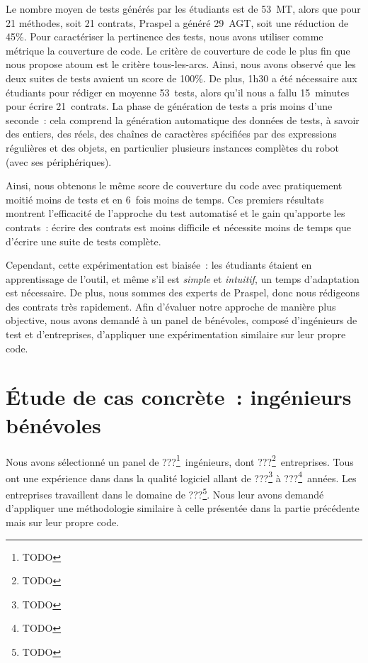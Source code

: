 Le nombre moyen de tests générés par les étudiants est de 53~MT, alors que pour
21 méthodes, soit 21 contrats, Praspel a généré 29~AGT, soit une réduction de
45\%. Pour caractériser la pertinence des tests, nous avons utiliser comme
métrique la couverture de code. Le critère de couverture de code le plus fin que
nous propose atoum est le critère tous-les-arcs. Ainsi, nous avons observé que
les deux suites de tests avaient un score de 100\%. De plus, 1h30 a été
nécessaire aux étudiants pour rédiger en moyenne 53~tests, alors qu'il nous a
fallu 15~minutes pour écrire 21~contrats.  La phase de génération de tests a
pris moins d'une seconde~: cela comprend la génération automatique des données
de tests, à savoir des entiers, des réels, des chaînes de caractères spécifiées
par des expressions régulières et des objets, en particulier plusieurs instances
complètes du robot (avec ses périphériques).

Ainsi, nous obtenons le même score de couverture du code avec pratiquement
moitié moins de tests et en 6~fois moins de temps. Ces premiers résultats
montrent l'efficacité de l'approche du test automatisé et le gain qu'apporte les
contrats~: écrire des contrats est moins difficile et nécessite moins de temps
que d'écrire une suite de tests complète.

Cependant, cette expérimentation est biaisée~: les étudiants étaient en
apprentissage de l'outil, et même s'il est {\em simple} et {\em intuitif}, un
temps d'adaptation est nécessaire. De plus, nous sommes des experts de Praspel,
donc nous rédigeons des contrats très rapidement. Afin d'évaluer notre approche
de manière plus objective, nous avons demandé à un panel de bénévoles, composé
d'ingénieurs de test et d'entreprises, d'appliquer une expérimentation similaire
sur leur propre code.

\section{Étude de cas concrète~: ingénieurs bénévoles}
\label{section:experimentation:real}

Nous avons sélectionné un panel de ???\footnote{TODO}~ingénieurs, dont
???\footnote{TODO}~entreprises. Tous ont une expérience dans dans la
qualité logiciel allant de ???\footnote{TODO} à ???\footnote{TODO}~années. Les
entreprises travaillent dans le domaine de ???\footnote{TODO}. Nous leur avons
demandé d'appliquer une méthodologie similaire à celle présentée dans la partie
précédente mais sur leur propre code.

